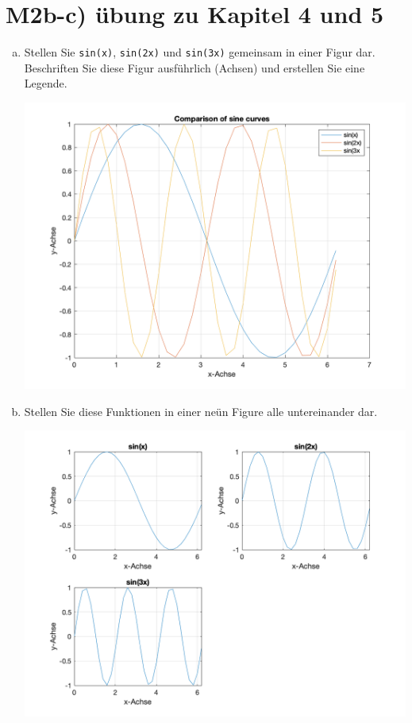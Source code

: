 \section{M2b-c) übung zu Kapitel 4 und 5}
\begin{enumerate}[a)]
\item Stellen Sie \texttt{sin(x)}, \texttt{sin(2x)} und \texttt{sin(3x)} gemeinsam in einer Figur dar. Beschriften Sie diese Figur ausführlich (Achsen) und erstellen Sie eine Legende.

\begin{center}
\includegraphics[scale=0.3]{../../PROJEKTE/ubungm2a/ubungm2a.png}
\end{center}
\item Stellen Sie diese Funktionen in einer neün Figure alle untereinander dar.

\begin{center}
\includegraphics[scale=0.3]{../../PROJEKTE/ubungm2b/ubungm2b.png}

\end{center}
\end{enumerate}
